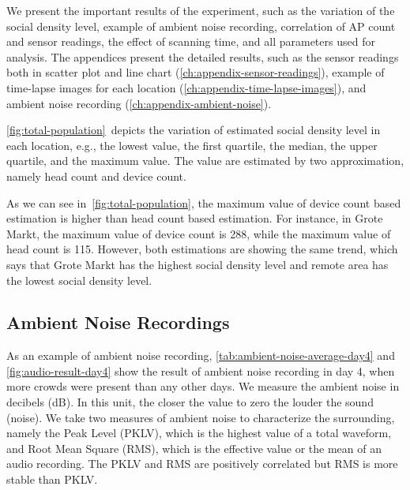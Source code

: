 We present the important results of the experiment, such as the variation of the social density level, example of ambient noise recording, correlation of \ac{AP} count and sensor readings, the effect of scanning time, and all parameters used for analysis. The appendices present the detailed results, such as the sensor readings both in scatter plot and line chart (\autoref{ch:appendix-sensor-readings}), example of time-lapse images for each location (\autoref{ch:appendix-time-lapse-images}), and ambient noise recording (\autoref{ch:appendix-ambient-noise}).

\autoref{fig:total-population}~depicts the variation of estimated social density level in each location, e.g., the lowest value, the first quartile, the median, the upper quartile, and the maximum value. The value are estimated by two approximation, namely head count and device count.

As we can see in~\autoref{fig:total-population}, the maximum value of device count based estimation is higher than head count based estimation. For instance, in Grote Markt, the maximum value of device count is 288, while the maximum value of head count is 115. However, both estimations are showing the same trend, which says that Grote Markt has the highest social density level and remote area has the lowest social density level.













	\subsection{Ambient Noise Recordings} %
	\label{sub:ambient_noise_recordings}
	As an example of ambient noise recording, \autoref{tab:ambient-noise-average-day4} and \autoref{fig:audio-result-day4} show the result of ambient noise recording in day 4, when more crowds were present than any other days. We measure the ambient noise in decibels (dB). In this unit, the closer the value to zero the louder the sound (noise). We take two measures of ambient noise to characterize the surrounding, namely the Peak Level (\ac{PKLV}), which is the highest value of a total waveform, and Root Mean Square (\ac{RMS}), which is the effective value or the mean of an audio recording. The \ac{PKLV} and \ac{RMS} are positively correlated but \ac{RMS} is more stable than \ac{PKLV}.

